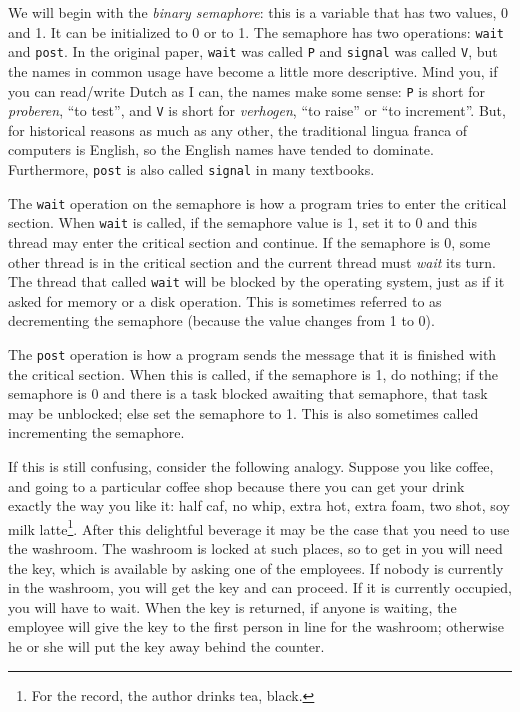\documentclass[a4paper]{report}
\begin{document}
We will begin with the \textit{binary semaphore}: this is a variable that has two values, 0 and 1. It can be initialized to 0 or to 1. The semaphore has two operations: \texttt{wait} and \texttt{post}. In the original paper, \texttt{wait} was called \texttt{P} and \texttt{signal} was called \texttt{V}, but the names in common usage have become a little more descriptive. Mind you, if you can read/write Dutch as I can, the names make some sense: \texttt{P} is short for \textit{proberen}, ``to test'', and \texttt{V} is short for \textit{verhogen}, ``to raise'' or ``to increment''. But, for historical reasons as much as any other, the traditional lingua franca of computers is English, so the English names have tended to dominate. Furthermore, \texttt{post} is also called \texttt{signal} in many textbooks.

The \texttt{wait} operation on the semaphore is how a program tries to enter the critical section. When \texttt{wait} is called, if the semaphore value is 1, set it to 0 and this thread may enter the critical section and continue. If the semaphore is 0, some other thread is in the critical section and the current thread must \textit{wait} its turn. The thread that called \texttt{wait} will be blocked by the operating system, just as if it asked for memory or a disk operation. This is sometimes referred to as decrementing the semaphore (because the value changes from 1 to 0).

The \texttt{post} operation is how a program sends the message that it is finished with the critical section. When this is called, if the semaphore is 1, do nothing; if the semaphore is 0 and there is a task blocked awaiting that semaphore, that task may be unblocked; else set the semaphore to 1. This is also sometimes called incrementing the semaphore.

If this is still confusing, consider the following analogy. Suppose you like coffee, and going to a particular coffee shop because there you can get your drink exactly the way you like it: half caf, no whip, extra hot, extra foam, two shot, soy milk latte\footnote{For the record, the author drinks tea, black.}. After this delightful beverage it may be the case that you need to use the washroom. The washroom is locked at such places, so to get in you will need the key, which is available by asking one of the employees. If nobody is currently in the washroom, you will get the key and can proceed. If it is currently occupied, you will have to wait. When the key is returned, if anyone is waiting, the employee will give the key to the first person in line for the washroom; otherwise he or she will put the key away behind the counter.
\end{document}

